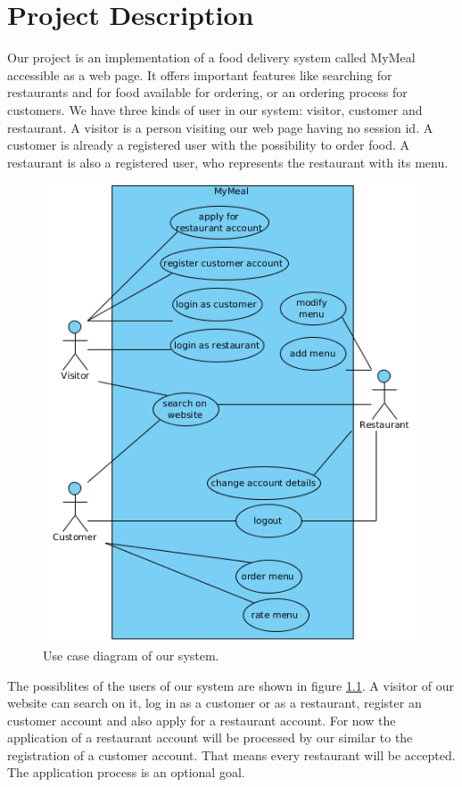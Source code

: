 \chapter{Project Description}
Our project is an implementation of a food delivery system called MyMeal accessible as
a web page. It offers important features like 
searching for restaurants and for food available for ordering, or an ordering
process for customers. We have three kinds of user in our system: visitor, customer and restaurant.
A visitor is a person visiting our web page having no session id. A customer is already a
registered user with the possibility to order food. A restaurant is also a
registered user, who represents the restaurant with its menu.

\begin{figure}[hb]
	\centering
		\includegraphics[scale=0.7]{content/graphics/usecase_diagram.png}
	\caption{Use case diagram of our system.}
    \label{fig:usecase_diagram}
\end{figure}


The possiblites of the users of our system are shown in figure \ref{fig:usecase_diagram}. A visitor of our website can search on it, log in as a customer or
as a restaurant, register an customer account and also apply for a restaurant account.
For now the application of a restaurant account will be processed by our similar to the
registration of a customer account. That means every restaurant will be accepted.
The application process is an optional goal.

